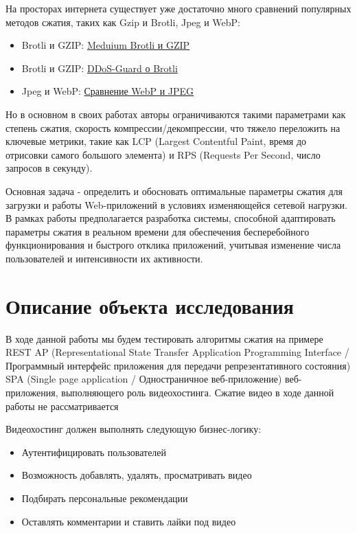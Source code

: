 \documentclass[12pt]{article}
\begin{document}
На просторах интернета существует уже достаточно много сравнений популярных методов сжатия, таких как Gzip и Brotli, Jpeg и WebP:

\begin{itemize}
        \item Brotli и GZIP: \href{https://medium.com/@bansal.suneet/brotli-vs-gzip-compression-surprising-compression-result-brotli-power-782aac2ee29f}{Meduium Brotli и GZIP}
        \item Brotli и GZIP: \href{https://ddos-guard.ru/blog/algoritmy-brotli-recompressiya-i-HSTS-chto-novogo-predlagaet-DDoS-GUARD}{DDoS-Guard о Brotli}
        \item Jpeg и WebP: \href{https://medium.com/@inna_netum/действительно-ли-webp-лучше-jpeg-91639d852035}{Сравнение WebP и JPEG}
\end{itemize}

Но в основном в своих работах авторы ограничиваются такими параметрами как степень сжатия, скорость компрессии/декомпрессии,
что тяжело переложить на ключевые метрики, такие как LCP (Largest Contentful Paint, время до отрисовки самого большого элемента) и RPS (Requests Per Second, число запросов в секунду).

Основная задача - определить и обосновать оптимальные параметры сжатия для загрузки и работы Web-приложений в условиях изменяющейся сетевой нагрузки.
В рамках работы предполагается разработка системы, способной адаптировать параметры сжатия в реальном времени для обеспечения бесперебойного
функционирования и быстрого отклика приложений, учитывая изменение числа пользователей и интенсивности их активности.

\section{Описание объекта исследования}

В ходе данной работы мы будем тестировать алгоритмы сжатия на примере REST AP
(Representational State Transfer Application Programming Interface / Программный интерфейс приложения для передачи репрезентативного состояния)
SPA (Single page application / Одностраничное веб-приложение) веб-приложения, выполняющего роль видеохостинга.
Сжатие видео в ходе данной работы не рассматривается

Видеохостинг должен выполнять следующую бизнес-логику:

\begin{itemize}
    \item Аутентифицировать пользователей
    \item Возможность добавлять, удалять, просматривать видео
    \item Подбирать персональные рекомендации
    \item Оставлять комментарии и ставить лайки под видео
\end{itemize}
\end{document}
